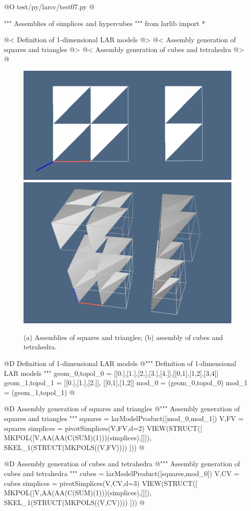 \documentclass[11pt,oneside]{article}    %
\begin{document}
@O test/py/larcc/test07.py
@{""" Assemblies of simplices and hypercubes """
from larlib import *

@< Definition of 1-dimensional LAR models @>
@< Assembly generation of squares and triangles @>
@< Assembly generation  of cubes and tetrahedra @>
@}

\begin{figure}[htbp] %
   \centering
   \includegraphics[width=0.405\linewidth]{images/assembly1} 
   \includegraphics[width=0.315\linewidth]{images/assembly2} 
   \caption{(a) Assemblies of squares and triangles; (b) assembly of cubes and tetrahedra.}
   \label{fig:example}
\end{figure}

@D Definition of 1-dimensional LAR models 
@{""" Definition of 1-dimensional LAR models  """
geom_0,topol_0 = [[0.],[1.],[2.],[3.],[4.]],[[0,1],[1,2],[3,4]]
geom_1,topol_1 = [[0.],[1.],[2.]], [[0,1],[1,2]]
mod_0 = (geom_0,topol_0)
mod_1 = (geom_1,topol_1)
@}

@D Assembly generation of squares and triangles
@{""" Assembly generation of squares and triangles """
squares = larModelProduct([mod_0,mod_1])
V,FV = squares
simplices = pivotSimplices(V,FV,d=2)
VIEW(STRUCT([ MKPOL([V,AA(AA(C(SUM)(1)))(simplices),[]]),
              SKEL_1(STRUCT(MKPOLS((V,FV)))) ]))
@}

@D Assembly generation  of cubes and tetrahedra 
@{""" Assembly generation  of cubes and tetrahedra """
cubes = larModelProduct([squares,mod_0])
V,CV = cubes
simplices = pivotSimplices(V,CV,d=3)
VIEW(STRUCT([ MKPOL([V,AA(AA(C(SUM)(1)))(simplices),[]]),
              SKEL_1(STRUCT(MKPOLS((V,CV)))) ]))
@}









\end{document}
